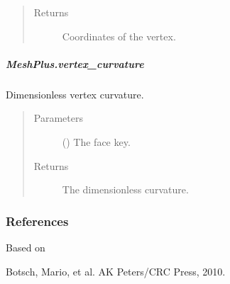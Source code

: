 \documentclass[letterpaper,10pt,english]{sphinxmanual}
\begin{document}
\begin{fulllineitems}
\begin{fulllineitems}
\begin{quote}
\begin{description}
\begin{itemize}
\end{itemize}

\item[{Returns}] \leavevmode
{} \textendash{} Coordinates of the vertex.

\end{description}\end{quote}

\end{fulllineitems}



\subparagraph{MeshPlus.vertex\_curvature}
\label{\detokenize{api/generated/directional_clustering.mesh.MeshPlus.vertex_curvature:meshplus-vertex-curvature}}\label{\detokenize{api/generated/directional_clustering.mesh.MeshPlus.vertex_curvature::doc}}

\begin{fulllineitems}
\label{\detokenize{api/generated/directional_clustering.mesh.MeshPlus.vertex_curvature:directional_clustering.mesh.MeshPlus.vertex_curvature}}
Dimensionless vertex curvature.
\begin{quote}\begin{description}
\item[{Parameters}] \leavevmode
{} () \textendash{} The face key.

\item[{Returns}] \leavevmode
{} \textendash{} The dimensionless curvature.

\end{description}\end{quote}
\subsubsection*{References}

Based on %
\begin{footnote}[1]\sphinxAtStartFootnote
Botsch, Mario, et al.  AK Peters/CRC Press, 2010.
%
\end{footnote}

\end{fulllineitems}




\end{fulllineitems}
\end{document}
